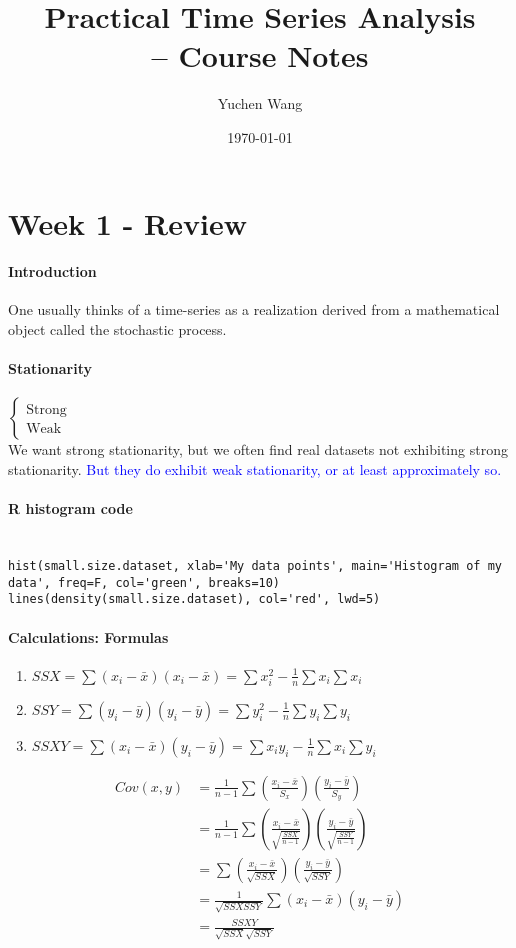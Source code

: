 \documentclass[11pt]{article}
\title{Practical Time Series Analysis \\ -- Course Notes}
\author{Yuchen Wang}
\date{\today}
\begin{document}
    \maketitle
    \tableofcontents
    \newpage
\section{Week 1 - Review}
\paragraph{Introduction}
One usually thinks of a time-series as a realization derived from a mathematical object called the stochastic process.
\paragraph{Stationarity}
$\begin{cases}
	\mbox{Strong} \\ \mbox{Weak}
\end{cases}$ \\
We want strong stationarity, but we often find real datasets not exhibiting strong stationarity. \textcolor{blue}{But they do exhibit weak stationarity, or at least approximately so.}
\paragraph{R histogram code}
\begin{align*}
\end{align*}
\begin{lstlisting}
hist(small.size.dataset, xlab='My data points', main='Histogram of my data', freq=F, col='green', breaks=10)
lines(density(small.size.dataset), col='red', lwd=5)
\end{lstlisting}
\paragraph{Calculations: Formulas}
\begin{enumerate}
	\item $SSX = \sum(x_i-\bar{x})(x_i - \bar{x}) = \sum x_i^2 -\frac{1}{n}\sum x_i\sum x_i$
	\item $SSY = \sum(y_i-\bar{y})(y_i - \bar{y}) = \sum y_i^2 -\frac{1}{n}\sum y_i\sum y_i$
	\item $SSXY = \sum(x_i - \bar{x})(y_i - \bar{y}) = \sum x_iy_i - \frac{1}{n}\sum x_i \sum y_i$
\end{enumerate}
\begin{align*}
	Cov(x, y) &= \frac{1}{n-1} \sum (\frac{x_i - \bar{x}}{S_x})(\frac{y_i - \bar{y}}{S_y}) \\
	&= \frac{1}{n-1} \sum (\frac{x_i - \bar{x}}{\sqrt{\frac{SSX}{n-1}}})(\frac{y_i - \bar{y}}{\sqrt{\frac{SSY}{n-1}}}) \\
	&= \sum(\frac{x_i - \bar{x}}{\sqrt{SSX}})(\frac{y_i - \bar{y}}{\sqrt{SSY}}) \\
	&= \frac{1}{\sqrt{SSX SSY}} \sum(x_i - \bar{x})(y_i - \bar{y})\\
	&= \frac{SSXY}{\sqrt{SSX}\sqrt{SSY}}
\end{align*}
\end{document}
